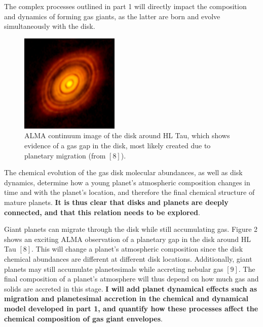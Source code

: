 \documentclass[12pt, letterpaper]{article}
\begin{document}
The complex processes outlined in part 1 will directly impact the composition and dynamics of forming gas giants, as the latter are born and evolve simultaneously with the disk. 
\begin{figure}
\vspace{-0.4in}
\begin{center}
\includegraphics[width=0.42\textwidth]{HLTau_nrao}
\end{center}
\caption{ALMA continuum image of the disk around HL Tau, which shows evidence of a gas gap in the disk, most likely created due to planetary migration (from $[8]$).}
\vspace{-0.25in}
\end{figure}
The chemical evolution of the gas disk molecular abundances, as well as disk dynamics, determine how a young planet's atmospheric composition changes in time and with the planet's location, and therefore the final chemical structure of mature planets. \textbf{It is thus clear that disks and planets are deeply connected, and that this relation needs to be explored}. %

Giant planets can migrate through the disk while still accumulating gas. Figure 2 shows an exciting ALMA observation of a planetary gap in the disk around HL Tau $[8]$. This will change a planet's atmospheric composition since the disk chemical abundances are different at different disk locations. Additionally, giant planets may still accumulate planetesimals while accreting nebular gas $[9]$. The final composition of a planet's atmosphere will thus depend on how much gas and solids are accreted in this stage. \textbf{I will add planet dynamical effects such as migration and planetesimal accretion in the chemical and dynamical model developed in part 1, and quantify how these processes affect the chemical composition of gas giant envelopes}.
\end{document}
